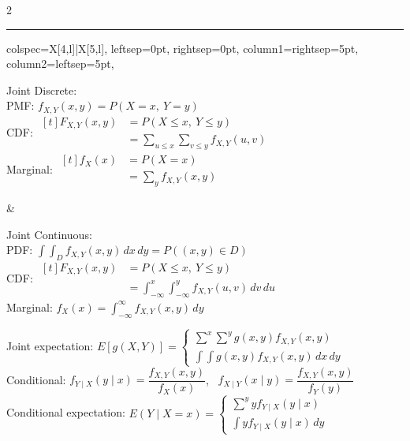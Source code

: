 \documentclass[12pt]{article}
\newcommand{\dd}[1]{\,d#1} %
\begin{document}
\begin{paracol}{2}
\begin{tcolorbox}[title=Probability Functions, width=465pt]
		\vspace*{1pt}\hrule\vspace*{1pt}

		\begin{tblr}{
				colspec={X[4,l]|X[5,l]},
				leftsep=0pt,
				rightsep=0pt,
				column{1}={rightsep=5pt},
				column{2}={leftsep=5pt},
			}
			\begin{minipage}[t]{\linewidth}
				Joint Discrete: \\
				PMF: $f_{X, Y}(x, y) = P(X = x,\ Y = y)$ \\
				CDF: $\begin{aligned}[t]
						F_{X, Y}(x, y) & = P(X \leq x,\ Y \leq y)                                     \\
						               & = \displaystyle\sum_{u \leq x}\sum_{v \leq y} f_{X, Y}(u, v)
					\end{aligned}$ \\
				Marginal: $\begin{aligned}[t]
						f_X(x) & = P(X=x)                             \\
						       & = \displaystyle\sum_y f_{X, Y}(x, y)
					\end{aligned}$
			\end{minipage}
			 &
			\begin{minipage}[t]{\linewidth}
				Joint Continuous: \\
				PDF: $\displaystyle\int\int_D f_{X, Y}(x, y)\dd{x}\dd{y} = P((x, y) \in D)$ \\
				CDF: $\begin{aligned}[t]
						F_{X, Y}(x, y) & = P(X \leq x,\ Y \leq y)                                                       \\
						               & = \displaystyle\int_{-\infty}^{x}\int_{-\infty}^{y} f_{X, Y}(u, v)\dd{v}\dd{u}
					\end{aligned}$ \\
				Marginal: $f_X(x) = \displaystyle\int_{-\infty}^{\infty}f_{X, Y}(x, y)\dd{y}$
			\end{minipage}
		\end{tblr}

		Joint expectation: $E[g(X,Y)] = \begin{cases}
				\displaystyle\sum^x\sum^y g(x,y)f_{X,Y}(x,y) \\[1.5ex]
				\displaystyle\int\!\!\int g(x,y)f_{X,Y}(x,y)\,dx\,dy
			\end{cases}$ \\
		Conditional: $f_{Y \mid X}(y \mid x) = \dfrac{f_{X, Y}(x, y)}{f_X(x)}$, \ $f_{X \mid Y}(x \mid y) = \dfrac{f_{X, Y}(x, y)}{f_Y(y)}$ \\
		Conditional expectation: $E(Y \mid X=x)=\begin{cases}
				\displaystyle\sum^y y f_{Y \mid X}(y \mid x) \\[1.5ex]
				\displaystyle\int y f_{Y \mid X}(y \mid x)\,dy
			\end{cases}$


\end{tcolorbox}
\end{paracol}
\end{document}
